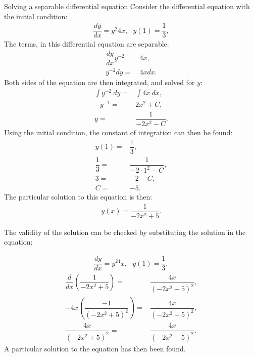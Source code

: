 \begin{example}{Solving a separable differential equation}{}
Consider the differential equation with the initial condition:
\begin{align*}
	\dfrac{dy}{dx} = y^2 4x, ~~~
	y(1) = \dfrac{1}{3},
\end{align*}
The terms, in this differential equation are separable: 
\begin{align*}
	\dfrac{dy}{dx} y^{-2} =& 4x, \\
	y^{-2} dy =& 4x dx. 
\end{align*}
Both sides of the equation are then integrated, and solved for $y$:
\begin{align*}
	\int{y^{-2}\ dy} =& \int{4x\  dx}, \\
	-y^{-1} =& 2x^2 +C, \\
	y =& \dfrac{1}{-2x^2-C}.
\end{align*}
Using the initial condition, the constant of integration can then be found:
\begin{align*}
	y(1) =& \dfrac{1}{3}, \\
	\dfrac{1}{3} =& \dfrac{1}{-2 \cdot 1^2-C}, \\
	3 =& -2-C, \\
	C =& -5.
\end{align*}
The particular solution to this equation is then:
\begin{align*}
	y(x) = \dfrac{1}{-2x^2+5}.
\end{align*}

The validity of the solution can be checked by substituting the solution in the equation:


\begin{align*}
	\dfrac{dy}{dx} = y^24x, ~~~
	y(1) = \dfrac{1}{3},
\end{align*}
\begin{align*}
	\dfrac{d}{dx} \left(\dfrac{1}{-2x^2+5}\right) =& \dfrac{4x}{(-2x^2+5)^2}, \\
	-4x\left(\dfrac{-1}{(-2x^2+5)^2}\right)  =& \dfrac{4x}{(-2x^2+5)^2}, \\
	\dfrac{4x}{(-2x^2+5)^2} =& \dfrac{4x}{(-2x^2+5)^2}.
\end{align*}
A particular solution to the equation has then been found.
\end{example}
